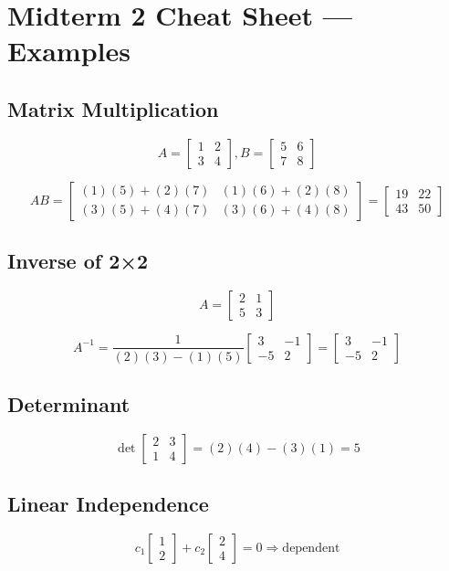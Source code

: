 \documentclass[10pt]{article}
\begin{document}
\small

\section*{Midterm 2 Cheat Sheet — Examples}

\subsection*{Matrix Multiplication}
\[
A = \begin{bmatrix}1 & 2 \\ 3 & 4\end{bmatrix}, 
B = \begin{bmatrix}5 & 6 \\ 7 & 8\end{bmatrix}
\]

\[
AB = \begin{bmatrix}
(1)(5)+(2)(7) & (1)(6)+(2)(8) \\
(3)(5)+(4)(7) & (3)(6)+(4)(8)
\end{bmatrix}
=
\begin{bmatrix}19 & 22 \\ 43 & 50\end{bmatrix}
\]

\subsection*{Inverse of 2×2}
\[
A = \begin{bmatrix}2 & 1 \\ 5 & 3\end{bmatrix}
\]

\[
A^{-1} = \frac{1}{(2)(3)-(1)(5)}
\begin{bmatrix}3 & -1 \\ -5 & 2\end{bmatrix}
= \begin{bmatrix}3 & -1 \\ -5 & 2\end{bmatrix}
\]

\subsection*{Determinant}
\[
\det \begin{bmatrix}2 & 3 \\ 1 & 4\end{bmatrix}
= (2)(4)-(3)(1)=5
\]

\subsection*{Linear Independence}
\[
c_1\begin{bmatrix}1 \\ 2\end{bmatrix}
+ c_2\begin{bmatrix}2 \\ 4\end{bmatrix} = 0
\Rightarrow \text{dependent}
\]
\end{document}
